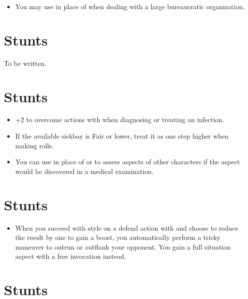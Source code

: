 \documentclass[12pt,titlepage,openany]{book}
\begin{document}
\begin{itemize}
    \item {} You may use  in place of
         when dealing with a large bureaucratic organization.
\end{itemize}

\section{ Stunts}\label{sub:engineering-stunts}

To be written.

\section{ Stunts}\label{sec:medicine-stunts}

\begin{itemize}
    \item {} +2 to overcome actions with
         when diagnosing or treating an infection.

    \item {} If the available sickbay is Fair or lower, treat
        it as one step higher when making  rolls.

    \item {} You can use  in place of
         or  to assess aspects of other characters
        if the aspect would be discovered in a medical examination.
\end{itemize}

\section{ Stunts}\label{sec:pilot-stunts}

\begin{itemize}
    \item {} When you succeed with style on a defend action
        with  and choose to reduce the result by one to gain a
        boost, you automatically perform a tricky maneuver to outrun or
        outflank your opponent. You gain a full situation aspect with a free
        invocation instead.
\end{itemize}

\section{ Stunts}\label{sec:presence-stunts}
\end{document}
